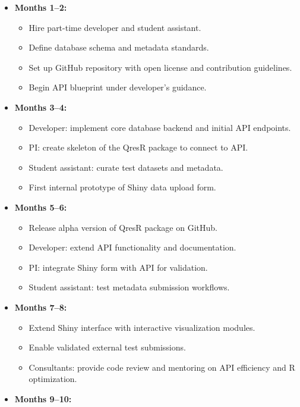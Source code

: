 \documentclass[
]{article}
\providecommand{\tightlist}{%
  \setlength{\itemsep}{0pt}\setlength{\parskip}{0pt}}
\begin{document}
\begin{itemize}
\tightlist
\item
  \textbf{Months 1--2:}

  \begin{itemize}
  \tightlist
  \item
    Hire part-time developer and student assistant.
  \item
    Define database schema and metadata standards.
  \item
    Set up GitHub repository with open license and contribution
    guidelines.
  \item
    Begin API blueprint under developer's guidance.
  \end{itemize}
\item
  \textbf{Months 3--4:}

  \begin{itemize}
  \tightlist
  \item
    Developer: implement core database backend and initial API
    endpoints.
  \item
    PI: create skeleton of the QresR package to connect to API.
  \item
    Student assistant: curate test datasets and metadata.
  \item
    First internal prototype of Shiny data upload form.
  \end{itemize}
\item
  \textbf{Months 5--6:}

  \begin{itemize}
  \tightlist
  \item
    Release alpha version of QresR package on GitHub.
  \item
    Developer: extend API functionality and documentation.
  \item
    PI: integrate Shiny form with API for validation.
  \item
    Student assistant: test metadata submission workflows.
  \end{itemize}
\item
  \textbf{Months 7--8:}

  \begin{itemize}
  \tightlist
  \item
    Extend Shiny interface with interactive visualization modules.
  \item
    Enable validated external test submissions.
  \item
    Consultants: provide code review and mentoring on API efficiency and
    R optimization.
  \end{itemize}
\item
  \textbf{Months 9--10:}


\end{itemize}
\end{document}
